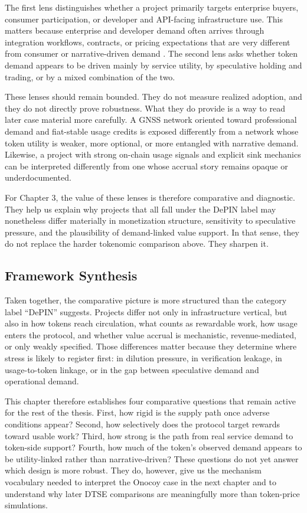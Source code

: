 The first lens distinguishes whether a project primarily targets enterprise buyers, consumer participation, or developer and API-facing infrastructure use. This matters because enterprise and developer demand often arrives through integration workflows, contracts, or pricing expectations that are very different from consumer or narrative-driven demand \cite{Lin2024, Ho2022}. The second lens asks whether token demand appears to be driven mainly by service utility, by speculative holding and trading, or by a mixed combination of the two.

These lenses should remain bounded. They do not measure realized adoption, and they do not directly prove robustness. What they do provide is a way to read later case material more carefully. A GNSS network oriented toward professional demand and fiat-stable usage credits is exposed differently from a network whose token utility is weaker, more optional, or more entangled with narrative demand. Likewise, a project with strong on-chain usage signals and explicit sink mechanics can be interpreted differently from one whose accrual story remains opaque or underdocumented.

For Chapter 3, the value of these lenses is therefore comparative and diagnostic. They help us explain why projects that all fall under the DePIN label may nonetheless differ materially in monetization structure, sensitivity to speculative pressure, and the plausibility of demand-linked value support. In that sense, they do not replace the harder tokenomic comparison above. They sharpen it.

\subsection{Framework Synthesis}
Taken together, the comparative picture is more structured than the category label ``DePIN'' suggests. Projects differ not only in infrastructure vertical, but also in how tokens reach circulation, what counts as rewardable work, how usage enters the protocol, and whether value accrual is mechanistic, revenue-mediated, or only weakly specified. Those differences matter because they determine where stress is likely to register first: in dilution pressure, in verification leakage, in usage-to-token linkage, or in the gap between speculative demand and operational demand.

This chapter therefore establishes four comparative questions that remain active for the rest of the thesis. First, how rigid is the supply path once adverse conditions appear? Second, how selectively does the protocol target rewards toward usable work? Third, how strong is the path from real service demand to token-side support? Fourth, how much of the token's observed demand appears to be utility-linked rather than narrative-driven? These questions do not yet answer which design is more robust. They do, however, give us the mechanism vocabulary needed to interpret the Onocoy case in the next chapter and to understand why later DTSE comparisons are meaningfully more than token-price simulations.
